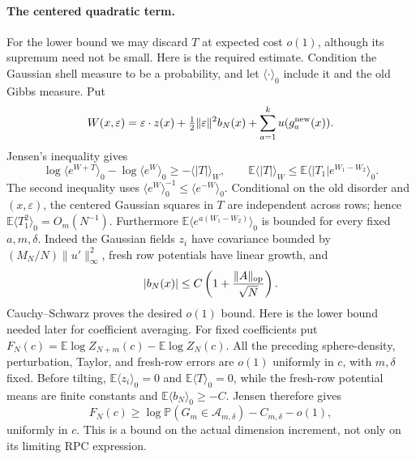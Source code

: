 \documentclass[11pt,a4paper]{article}
\numberwithin{equation}{section}
\theoremstyle{definition}
\theoremstyle{remark}
\newcommand{\E}{\mathbb E}
\newcommand{\Prob}{\mathbb P}
\newcommand{\eps}{\varepsilon}
\begin{document}
\paragraph{The centered quadratic term.}
For the lower bound we may discard $T$ at expected cost $o(1)$, although its
supremum need not be small. Here is the required estimate. Condition the
Gaussian shell measure to be a probability, and let $\langle\cdot\rangle_0$
include it and the old Gibbs measure. Put
\[
 W(x,\eps)=\eps\cdot z(x)+\tfrac12\|\eps\|^2b_N(x)
                    +\sum_{a=1}^k u(g_a^{\rm new}(x)).
\]
Jensen's inequality gives
\[
 \log\langle e^{W+T}\rangle_0-\log\langle e^W\rangle_0
 \ge-\langle|T|\rangle_W,
 \qquad
 \E\langle|T|\rangle_W
 \le\E\langle |T_1|e^{W_1-W_2}\rangle_0.
\]
The second inequality uses
$\langle e^W\rangle_0^{-1}\le\langle e^{-W}\rangle_0$.
Conditional on the old disorder and $(x,\eps)$, the centered Gaussian squares
in $T$ are independent across rows; hence
$\E\langle T_1^2\rangle_0=O_m(N^{-1})$.
Furthermore $\E\langle e^{a(W_1-W_2)}\rangle_0$ is bounded for every fixed
$a,m,\delta$. Indeed the Gaussian fields $z_i$ have covariance bounded by
$(M_N/N)\|u'\|_\infty^2$, fresh row potentials have linear growth, and
\[
 |b_N(x)|\le C\left(1+\frac{\|A\|_{\rm op}}{\sqrt N}\right).
\]
Cauchy--Schwarz proves the desired $o(1)$ bound. Here is the lower bound needed later for coefficient averaging. For fixed
coefficients put $F_N(c)=\E\log Z_{N+m}(c)-\E\log Z_N(c)$. All the preceding
sphere-density, perturbation, Taylor, and fresh-row errors are $o(1)$ uniformly
in $c$, with $m,\delta$ fixed. Before tilting, $\E\langle z_i\rangle_0=0$
and $\E\langle T\rangle_0=0$, while the fresh-row potential means are finite
constants and $\E\langle b_N\rangle_0\ge-C$. Jensen therefore gives
\[
 F_N(c)\ge \log\Prob(G_m\in\mathcal A_{m,\delta})-C_{m,\delta}-o(1),
\]
uniformly in $c$. This is a bound on the actual dimension increment,
not only on its limiting RPC expression.
\end{document}
